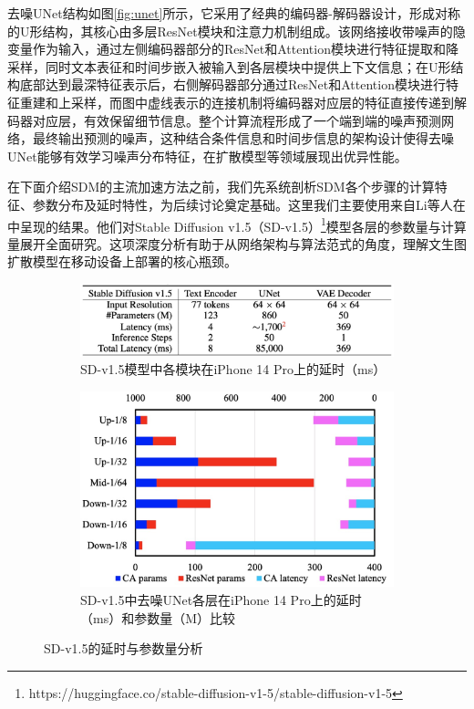 \documentclass[11pt,a4paper,UTF8]{ctexart}
\begin{document}
去噪UNet结构如图\ref{fig:unet}所示，它采用了经典的编码器-解码器设计，形成对称的U形结构，其核心由多层ResNet模块和注意力机制组成。该网络接收带噪声的隐变量作为输入，通过左侧编码器部分的ResNet和Attention模块进行特征提取和降采样，同时文本表征和时间步嵌入被输入到各层模块中提供上下文信息；在U形结构底部达到最深特征表示后，右侧解码器部分通过ResNet和Attention模块进行特征重建和上采样，而图中虚线表示的连接机制将编码器对应层的特征直接传递到解码器对应层，有效保留细节信息。整个计算流程形成了一个端到端的噪声预测网络，最终输出预测的噪声，这种结合条件信息和时间步信息的架构设计使得去噪UNet能够有效学习噪声分布特征，在扩散模型等领域展现出优异性能。

在下面介绍SDM的主流加速方法之前，我们先系统剖析SDM各个步骤的计算特征、参数分布及延时特性，为后续讨论奠定基础。这里我们主要使用来自Li等人在\cite{li2023snapfusion}中呈现的结果。他们对Stable Diffusion v1.5（SD-v1.5）\footnote{https://huggingface.co/stable-diffusion-v1-5/stable-diffusion-v1-5}模型各层的参数量与计算量展开全面研究。这项深度分析有助于从网络架构与算法范式的角度，理解文生图扩散模型在移动设备上部署的核心瓶颈。


\begin{figure}[htbp]
    \centering
    \begin{subfigure}[b]{0.49\textwidth}
        \centering
        \includegraphics[width=\linewidth]{img/sdv15_latency.jpg}
        \caption{SD-v1.5模型中各模块在iPhone 14 Pro上的延时（ms）}
        \label{fig:latency_three}
    \end{subfigure}
    \hfill
    \begin{subfigure}[b]{0.49\textwidth}
        \centering
        \includegraphics[width=\linewidth]{img/unet_latency_params.jpg}
        \caption{SD-v1.5中去噪UNet各层在iPhone 14 Pro上的延时（ms）和参数量（M）比较}
        \label{fig:latency_params_unet}
    \end{subfigure}
    \caption{SD-v1.5的延时与参数量分析}
    \label{fig:sd_v15}
\end{figure}
\end{document}
